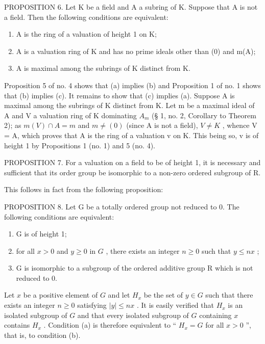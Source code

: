 PROPOSITION 6. Let K be a field and A a subring of K. Suppose that A is not a field. Then the following conditions are equivalent:

\begin{enumerate}
\def\labelenumi{(\alph{enumi})}
\item
  A is the ring of a valuation of height 1 on K;
\item
  A is a valuation ring of K and has no prime ideals other than (0) and m(A);
\item
  A is maximal among the subrings of K distinct from K.
\end{enumerate}

Proposition 5 of no. 4 shows that (a) implies (b) and Proposition 1 of no. 1 shows that (b) implies (c). It remains to show that (c) implies (a). Suppose A is maximal among the subrings of K distinct from K. Let m be a maximal ideal of A and V a valuation ring of K dominating \(A_{m}\) (§ 1, no. 2, Corollary to Theorem 2); as \(m(V) \cap A = m\) and \(m \neq (0)\) (since A is not a field), \(V \neq K\) , whence V = A, which proves that A is the ring of a valuation v on K. This being so, v is of height 1 by Propositions 1 (no. 1) and 5 (no. 4).

PROPOSITION 7. For a valuation on a field to be of height 1, it is necessary and sufficient that its order group be isomorphic to a non-zero ordered subgroup of R.

This follows in fact from the following proposition:

PROPOSITION 8. Let G be a totally ordered group not reduced to 0. The following conditions are equivalent:

\begin{enumerate}
\def\labelenumi{(\alph{enumi})}
\item
  G is of height 1;
\item
  for all \(x > 0\) and \(y \geqslant 0\) in \(G\) , there exists an integer \(n \geqslant 0\) such that \(y \leqslant nx\) ;
\item
  G is isomorphic to a subgroup of the ordered additive group R which is not reduced to 0.
\end{enumerate}

Let \(x\) be a positive element of \(G\) and let \(H_x\) be the set of \(y \in G\) such that there exists an integer \(n \geqslant 0\) satisfying \(|y| \leqslant nx\) . It is easily verified that \(H_x\) is an isolated subgroup of \(G\) and that every isolated subgroup of \(G\) containing \(x\) contains \(H_x\) . Condition (a) is therefore equivalent to `` \(H_x = G\) for all \(x > 0\) '', that is, to condition (b).

